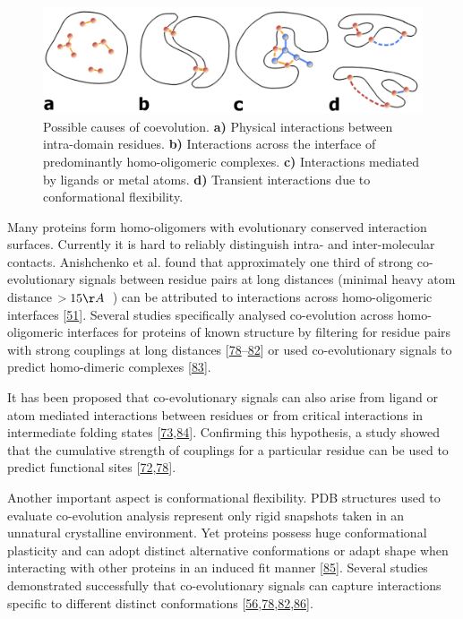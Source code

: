 \documentclass[12pt,a4paper,twoside]{book}
\theoremstyle{definition}
\theoremstyle{definition}
\theoremstyle{remark}
\begin{document}
\begin{figure}

{\centering \includegraphics[width=0.8\linewidth]{img/intro/sources_of_coevolution} 

}

\caption{Possible causes of coevolution.
\textbf{a)} Physical interactions between intra-domain residues.
\textbf{b)} Interactions across the interface of predominantly
homo-oligomeric complexes. \textbf{c)} Interactions mediated by ligands
or metal atoms. \textbf{d)} Transient interactions due to conformational
flexibility.}\label{fig:sources-coevolution}
\end{figure}

Many proteins form homo-oligomers with evolutionary conserved
interaction surfaces. Currently it is hard to reliably distinguish
intra- and inter-molecular contacts. Anishchenko et al. found that
approximately one third of strong co-evolutionary signals between
residue pairs at long distances (minimal heavy atom distance
\(>15 \AA \;\;\)) can be attributed to interactions across
homo-oligomeric interfaces
{[}\protect\hyperlink{ref-Anishchenko2017}{51}{]}. Several studies
specifically analysed co-evolution across homo-oligomeric interfaces for
proteins of known structure by filtering for residue pairs with strong
couplings at long distances
{[}\protect\hyperlink{ref-Hopf2012}{78}--\protect\hyperlink{ref-Jana2014}{82}{]}
or used co-evolutionary signals to predict homo-dimeric complexes
{[}\protect\hyperlink{ref-DosSantos2015a}{83}{]}.

It has been proposed that co-evolutionary signals can also arise from
ligand or atom mediated interactions between residues or from critical
interactions in intermediate folding states
{[}\protect\hyperlink{ref-Buslje2009}{73},\protect\hyperlink{ref-Ovchinnikov2015b}{84}{]}.
Confirming this hypothesis, a study showed that the cumulative strength
of couplings for a particular residue can be used to predict functional
sites
{[}\protect\hyperlink{ref-Marks2012}{72},\protect\hyperlink{ref-Hopf2012}{78}{]}.

Another important aspect is conformational flexibility. PDB structures
used to evaluate co-evolution analysis represent only rigid snapshots
taken in an unnatural crystalline environment. Yet proteins possess huge
conformational plasticity and can adopt distinct alternative
conformations or adapt shape when interacting with other proteins in an
induced fit manner {[}\protect\hyperlink{ref-Noel2016}{85}{]}. Several
studies demonstrated successfully that co-evolutionary signals can
capture interactions specific to different distinct conformations
{[}\protect\hyperlink{ref-Morcos2011}{56},\protect\hyperlink{ref-Hopf2012}{78},\protect\hyperlink{ref-Jana2014}{82},\protect\hyperlink{ref-Sfriso2016}{86}{]}.
\end{document}
